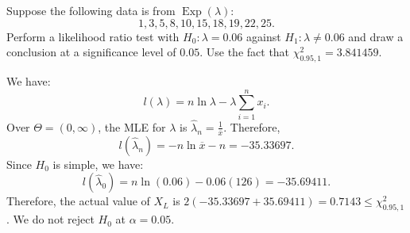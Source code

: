 \documentclass{huhtakm-template-book-v2}
\DeclareMathOperator{\Exp}{Exp}
\begin{document}
    \begin{eg}
        Suppose the following data is from $\Exp(\lambda)$:
        \begin{equation*}
            1,3,5,8,10,15,18,19,22,25.
        \end{equation*}
        Perform a likelihood ratio test with $H_{0}:\lambda=0.06$ against $H_{1}:\lambda\neq 0.06$ and draw a conclusion at a significance level of $0.05$. Use the fact that $\chi_{0.95,1}^{2}=3.841459$.
        
        We have:
        \begin{equation*}
            l(\lambda)=n\ln{\lambda}-\lambda\sum_{i=1}^{n}x_{i}.
        \end{equation*}
        Over $\Theta=(0,\infty)$, the MLE for $\lambda$ is $\hat{\lambda}_{n}=\frac{1}{\overline{x}}$. Therefore,
        \begin{equation*}
            l(\hat{\lambda}_{n})=-n\ln{\overline{x}}-n=-35.33697.
        \end{equation*}
        Since $H_{0}$ is simple, we have:
        \begin{equation*}
            l(\hat{\lambda}_{0})=n\ln(0.06)-0.06(126)=-35.69411.
        \end{equation*}
        Therefore, the actual value of $X_{L}$ is $2(-35.33697+35.69411)=0.7143\leq\chi_{0.95,1}^{2}$. We do not reject $H_{0}$ at $\alpha=0.05$.
    \end{eg}
    \newpage
    
\end{document}
